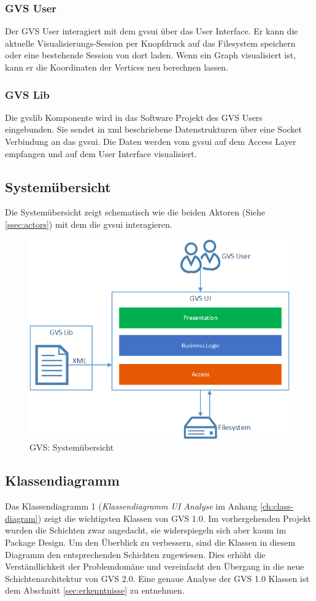 \documentclass[11pt,a4paper,english,oneside]{book}
\numberwithin{equation}{chapter}
\begin{document}
	\subsubsection{GVS User} \label{sssec:actor-user}
	Der GVS User interagiert mit dem \gls{gvsui} über das User Interface. Er kann die aktuelle Visualisierungs-Session per Knopfdruck auf das Filesystem speichern oder eine bestehende Session von dort laden. Wenn ein Graph visualisiert ist, kann er die Koordinaten der Vertices neu berechnen lassen.
	
	\subsubsection{GVS Lib} \label{sssec:actor-lib}
	Die \gls{gvslib} Komponente wird in das Software Projekt des GVS Users eingebunden. Sie sendet in \gls{xml} beschriebene Datenstrukturen über eine Socket Verbindung an das \gls{gvsui}. Die Daten werden vom \gls{gvsui} auf dem Access Layer empfangen und auf dem User Interface visualisiert.
	
	\subsection{Systemübersicht}
	Die Systemübersicht zeigt schematisch wie die beiden Aktoren (Siehe \ref{ssec:actors}) mit dem  die \gls{gvsui} interagieren.
	
	\begin{figure}[h!]
		\centering
		\includegraphics[width=0.5\linewidth]{assets/images/system_overview}
		\caption{GVS: Systemübersicht}
		\label{fig:gvs-systemuebersicht}
	\end{figure}
	
	\subsection{Klassendiagramm} \label{ssec:klassendiagramm-1}
	Das Klassendiagramm 1 (\textit{Klassendiagramm UI Analyse} im Anhang \ref{ch:class-diagram}) zeigt die wichtigsten Klassen von GVS 1.0. Im vorhergehenden Projekt wurden die Schichten zwar angedacht, sie widerspiegeln sich aber kaum im Package Design. Um den Überblick zu verbessern, sind die Klassen in diesem Diagramm den entsprechenden Schichten zugewiesen. Dies erhöht die Verständlichkeit der Problemdomäne und vereinfacht den Übergang in die neue Schichtenarchitektur von GVS 2.0. Eine genaue Analyse der GVS 1.0 Klassen ist dem Abschnitt \ref{sec:erkenntnisse} zu entnehmen. 
		
\end{document}
